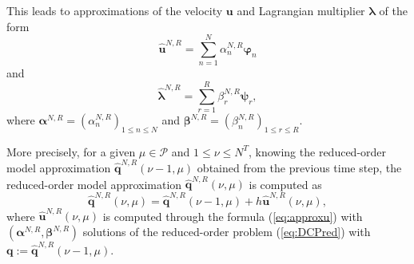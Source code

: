 This leads to approximations of the velocity $\mathbf{u}$ and Lagrangian multiplier $\boldsymbol{\lambda}$ of the form 
\begin{equation}\label{eq:approxu}
\hat{\mathbf{u}}^{N,R} = \sum_{n=1}^N \alpha_n^{N,R} \boldsymbol{\varphi}_n
\end{equation}
and 
$$
\hat{\boldsymbol{\lambda}}^{N,R} = \sum_{r=1}^R \beta_r^{N,R} \boldsymbol{\psi}_r,
$$
where $\boldsymbol{\alpha}^{N,R} =(\alpha_n^{N,R})_{1\leq n \leq N}$ and $\boldsymbol{\beta}^{N,R} =(\beta_n^{N,R})_{1\leq r \leq R}$. 

\medskip

More precisely, for a given $\mu \in \mathcal P$ and $1\leq \nu \leq N^T$, knowing the reduced-order model approximation $\hat{\mathbf{q}}^{N,R}(\nu-1, \mu)$ obtained from the previous time step, the reduced-order model approximation $\hat{\mathbf{q}}^{N,R}(\nu, \mu)$ is computed as
$$
\hat{\mathbf{q}}^{N,R}(\nu, \mu)  = \hat{\mathbf{q}}^{N,R}(\nu-1, \mu) + h \hat{\mathbf{u}}^{N,R}(\nu, \mu),
$$
where $\hat{\mathbf{u}}^{N,R}(\nu, \mu)$ is computed through the formula (\ref{eq:approxu}) with $(\boldsymbol{\alpha}^{N,R}, \boldsymbol{\beta}^{N,R})$ solutions of the reduced-order problem (\ref{eq:DCPred}) with $\mathbf{q}:= \hat{\mathbf{q}}^{N,R}(\nu-1, \mu)$. 


